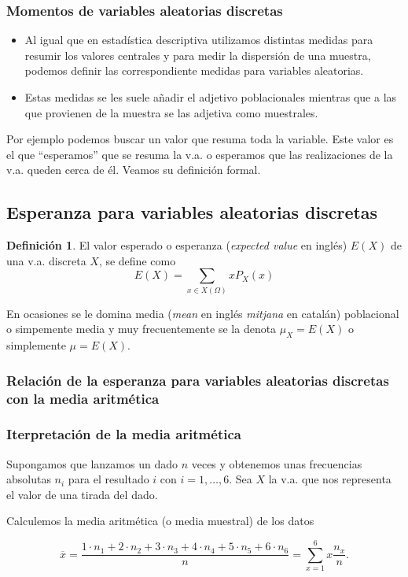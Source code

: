 \documentclass[handout]{beamer}\usepackage[]{graphicx}\usepackage[]{color}
\renewcommand{\emph}[1]{{\color{red}#1}}
\theoremstyle{plain}
\theoremstyle{definition}
\newtheorem{definicion}{Definición}
\begin{document}
\begin{frame}
\frametitle{Momentos de variables aleatorias discretas}

\begin{itemize}
\item Al igual que en  estadística descriptiva  utilizamos distintas medidas para
resumir los valores centrales y para medir la dispersión de una muestra, podemos definir
las correspondiente medidas para variables aleatorias.

\item Estas medidas se les suele añadir
el adjetivo poblacionales mientras que a las que provienen de la muestra se las adjetiva
como muestrales.
\end{itemize}

Por ejemplo  podemos buscar un valor que resuma toda la variable.
Este valor es el que ``\emph{esperamos}'' que se resuma la v.a. o esperamos que las
realizaciones de la v.a. queden cerca de él. Veamos su definición formal.

\end{frame}

\subsection{Esperanza para variables aleatorias discretas}

\begin{frame}


\begin{definicion}
    El valor \emph{esperado o esperanza} (\textsl{expected value} en inglés) $E(X)$ de una v.a. discreta $X$, se define como
    $$E(X)=\sum_{x\in X(\Omega)} x P_{X}(x)$$

    En ocasiones se le domina \emph{media} (\textsl{mean} en inglés \textsl{mitjana} en catalán) poblacional o simpemente media y muy frecuentemente se la denota
    $\mu_{X}=E(X)$ o simplemente $\mu=E(X)$.
    \end{definicion}
\end{frame}

\subsubsection{Relación de la esperanza para variables aleatorias
discretas con la media aritmética}


\begin{frame}
\frametitle{Iterpretación de la media aritmética}

Supongamos que lanzamos un dado $n$ veces y obtenemos unas frecuencias absolutas $n_{i}$
para el resultado $i$ con $i=1,\ldots,6$. Sea $X$ la v.a. que nos representa el valor de
una tirada del dado.

Calculemos la media aritmética (o media muestral) de los datos

$$\overline{x}=\frac{1\cdot n_{1}+2\cdot  n_{2}+3\cdot  n_{3}+4\cdot  n_{4}+5\cdot  n_{5}+6 \cdot 
n_{6}}{n}=\sum_{x=1}^{6} x \frac{n_{x}}{n}.$$
\end{frame}
\end{document}
